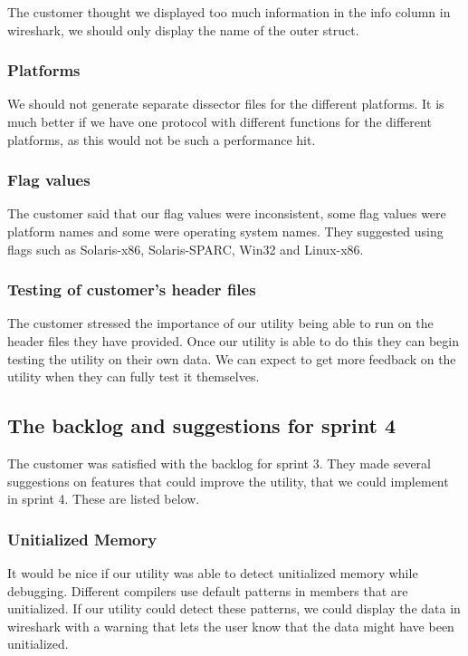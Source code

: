 The customer thought we displayed too much information in the info column in \Gls{wireshark},
 we should only display the name of the outer \gls{struct}.

\subsubsection{Platforms}

We should not generate separate \gls{dissector} files for the different platforms. It is much better if we have one \gls{protocol}
with different functions for the different platforms, as this would not be such a performance hit.

\subsubsection{Flag values}

The customer said that our flag values were inconsistent, some flag values were platform names and some were operating
system names. They suggested using flags such as Solaris-x86, Solaris-SPARC, Win32 and Linux-x86.

\subsubsection{Testing of customer's \gls{header} files}

The customer stressed the importance of our \gls{utility} being able to run on the \gls{header} files they have provided.
Once our \gls{utility} is able to do this they can begin testing the \gls{utility} on their own data.
We can expect to get more feedback on the \gls{utility} when they can fully test it themselves.


\subsection{The backlog and suggestions for sprint 4}

The customer was satisfied with the backlog for sprint 3.
They made several suggestions on features that could improve the \gls{utility}, that we could implement in sprint 4.
These are listed below.

\subsubsection{Unitialized Memory}

It would be nice if our \gls{utility} was able to detect unitialized memory while debugging.
Different compilers use default patterns in \glspl{member} that are unitialized. If our \gls{utility} could detect these patterns,
we could display the data in \Gls{wireshark} with a warning that lets the user know that the data might have been unitialized.

